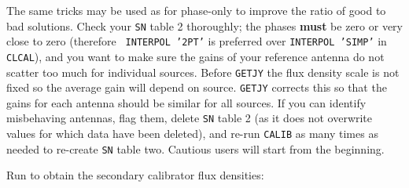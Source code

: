 The same tricks may be used as for phase-only to improve the ratio of
good to bad solutions.  Check your {\tt SN} table 2 thoroughly; the
phases {\bf must} be zero or very close to zero (therefore {\tt
INTERPOL '2PT'} is preferred over {\tt INTERPOL 'SIMP'} in {\tt
CLCAL}), and you want to make sure the gains of your reference antenna
do not scatter too much for individual sources.  Before {\tt GETJY}
the flux density scale is not fixed so the average gain will depend on
source.  {\tt GETJY} corrects this so that the gains for each antenna
should be similar for all sources.  If you can identify misbehaving
antennas, flag them, delete {\tt SN} table 2 (as it does not overwrite
values for which data have been deleted), and re-run {\tt CALIB} as
many times as needed to re-create {\tt SN} table two. Cautious users
will start from the beginning.

Run {\tt {}} to obtain the secondary calibrator flux
densities:

